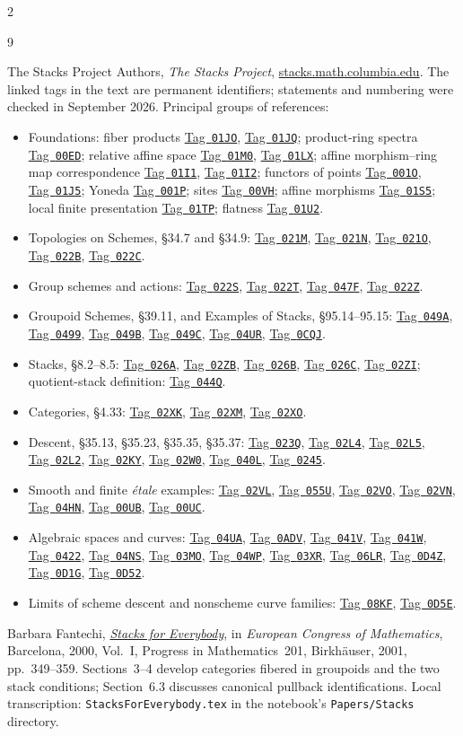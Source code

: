 \documentclass[12pt]{memoir}
\newcommand{\BGtag}[1]{\href{https://stacks.math.columbia.edu/tag/#1}{Tag~\texttt{#1}}}
\begin{document}
\begin{multicols}{2}
\begin{thebibliography}{9}
\raggedright
{}
The Stacks Project Authors, \emph{The Stacks Project},
\href{https://stacks.math.columbia.edu}{stacks.math.columbia.edu}.
The linked tags in the text are permanent identifiers; statements and
numbering were checked in September 2026. Principal groups of references:
\begin{itemize}
\item Foundations: fiber products \BGtag{01JO}, \BGtag{01JQ};
product-ring spectra \BGtag{00ED}; relative affine space \BGtag{01M0},
\BGtag{01LX}; affine morphism--ring map correspondence \BGtag{01I1},
\BGtag{01I2}; functors of points \BGtag{001O}, \BGtag{01J5};
Yoneda \BGtag{001P};
sites \BGtag{00VH}; affine morphisms \BGtag{01S5}; local finite
presentation \BGtag{01TP}; flatness \BGtag{01U2}.
\item Topologies on Schemes, \S34.7 and \S34.9:
\BGtag{021M}, \BGtag{021N}, \BGtag{021O}, \BGtag{022B}, \BGtag{022C}.
\item Group schemes and actions: \BGtag{022S}, \BGtag{022T},
\BGtag{047F}, \BGtag{022Z}.
\item Groupoid Schemes, \S39.11, and Examples of Stacks, \S95.14--95.15:
\BGtag{049A}, \BGtag{0499}, \BGtag{049B}, \BGtag{049C},
\BGtag{04UR}, \BGtag{0CQJ}.
\item Stacks, \S8.2--8.5: \BGtag{026A}, \BGtag{02ZB},
\BGtag{026B}, \BGtag{026C}, \BGtag{02ZI}; quotient-stack definition:
\BGtag{044Q}.
\item Categories, \S4.33: \BGtag{02XK}, \BGtag{02XM}, \BGtag{02XO}.
\item Descent, \S35.13, \S35.23, \S35.35, \S35.37:
\BGtag{023Q}, \BGtag{02L4}, \BGtag{02L5}, \BGtag{02L2},
\BGtag{02KY}, \BGtag{02W0}, \BGtag{040L}, \BGtag{0245}.
\item Smooth and finite \emph{\'etale} examples:
\BGtag{02VL}, \BGtag{055U}, \BGtag{02VO}, \BGtag{02VN},
\BGtag{04HN}, \BGtag{00UB}, \BGtag{00UC}.
\item Algebraic spaces and curves: \BGtag{04UA}, \BGtag{0ADV},
\BGtag{041V}, \BGtag{041W}, \BGtag{0422}, \BGtag{04NS},
\BGtag{03MO}, \BGtag{04WP}, \BGtag{03XR}, \BGtag{06LR},
\BGtag{0D4Z}, \BGtag{0D1G}, \BGtag{0D52}.
\item Limits of scheme descent and nonscheme curve families:
\BGtag{08KF}, \BGtag{0D5E}.
\end{itemize}

Barbara Fantechi,
\href{https://doi.org/10.1007/978-3-0348-8268-2_20}{\emph{Stacks for Everybody}}, in
\emph{European Congress of Mathematics}, Barcelona, 2000, Vol.~I,
Progress in Mathematics~201, Birkh\"auser, 2001, pp.~349--359.
Sections~3--4 develop categories
fibered in groupoids and the two stack conditions; Section~6.3 discusses
canonical pullback identifications. Local transcription:
\texttt{StacksForEverybody.tex} in the notebook's
\texttt{Papers/Stacks} directory.


\end{thebibliography}
\end{multicols}
\end{document}
